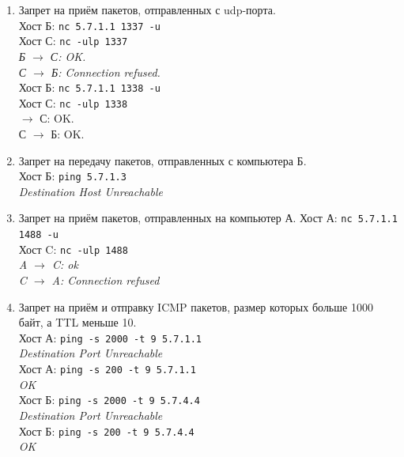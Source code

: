 \documentclass[11pt, a4paper] {ncc}
\begin{document}
\begin{enumerate}
\begin{enumerate}
                \item Запрет на приём пакетов, отправленных с udp-порта. \\
                    Хост Б: \texttt{nc 5.7.1.1 1337 -u} \\
                    Хост С: \texttt{nc -ulp 1337}\\
                    {\it Б $\to$ С: OK.\\
                    С $\to$ Б: Connection refused.}\\
                    Хост Б: \texttt{nc 5.7.1.1 1338 -u} \\
                    Хост С: \texttt{nc -ulp 1338}\\
                    { $\to$ С: OK.\\
                    С $\to$ Б: OK.}
                \item Запрет на передачу пакетов, отправленных с компьютера Б.\\
                    Хост Б: \texttt{ping 5.7.1.3}\\
                    \textit{Destination Host Unreachable}
                \item Запрет на приём пакетов, отправленных на компьютер А.
                    Хост А: \texttt{nc 5.7.1.1 1488 -u} \\
                    Хост C: \texttt{nc -ulp 1488} \\
                    {\it A $\to$ C: ok \\
                         C $\to$ A: Connection refused
                    }
                \item Запрет на приём и отправку ICMP пакетов, размер которых больше 1000 байт, а TTL меньше 10. \\
                    Хост А: \texttt{ping -s 2000 -t 9 5.7.1.1} \\
                    {\it Destination Port Unreachable} \\
                    Хост А: \texttt{ping -s 200 -t 9 5.7.1.1} \\
                    {\it OK} \\
                    Хост Б: \texttt{ping -s 2000 -t 9 5.7.4.4} \\
                    {\it Destination Port Unreachable} \\
                    Хост Б: \texttt{ping -s 200 -t 9 5.7.4.4} \\
                    {\it OK} \\
            \end{enumerate}
    \end{enumerate}
    
\end{document}
